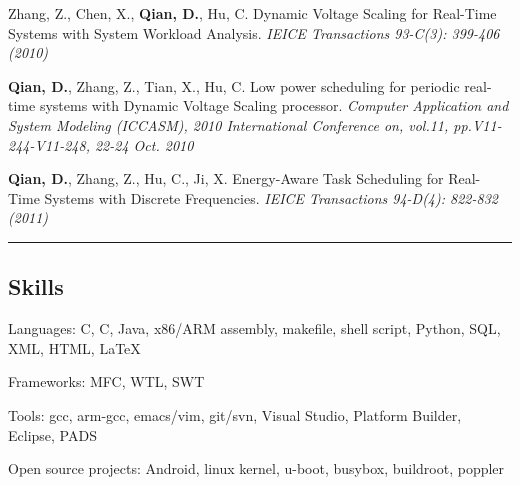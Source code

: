 \documentclass[10pt,letterpaper]{article}
\newenvironment{indentsection}[1]%
{\begin{list}{}%
	{\setlength{\leftmargin}{#1}}%
	\item[]%
}
{\end{list}}
\newcommand{\CPP}
{C\nolinebreak[4]\hspace{-.05em}\raisebox{.22ex}{\footnotesize\bf ++}}
\begin{document}
\begin{itemize*}
        \item
        Zhang, Z., Chen, X., \textbf{Qian, D.}, Hu, C. Dynamic Voltage Scaling for Real-Time Systems with System Workload Analysis. \emph{IEICE Transactions 93-C(3): 399-406 (2010)}
	\item
        \textbf{Qian, D.}, Zhang, Z., Tian, X., Hu, C. Low power scheduling for periodic real-time systems with Dynamic Voltage Scaling processor. \emph{Computer Application and System Modeling (ICCASM), 2010 International Conference on, vol.11, pp.V11-244-V11-248, 22-24 Oct. 2010}
	\item
	\textbf{Qian, D.}, Zhang, Z., Hu, C., Ji, X. Energy-Aware Task Scheduling for Real-Time Systems with Discrete Frequencies. \emph{IEICE Transactions 94-D(4): 822-832 (2011)}
\end{itemize*}

\hrule
\vspace{-0.4em}
\subsection*{Skills}

\begin{indentsection}{\parindent}
\begin{description*}
	\item[Languages:] C, \CPP, Java, x86/ARM assembly, makefile, shell script, Python, SQL, XML, HTML, \LaTeX
	\item[Frameworks:] MFC, WTL, SWT
	\item[Tools:] gcc, arm-gcc, emacs/vim, git/svn, Visual Studio, Platform Builder, Eclipse, PADS
	\item[Open source projects:]
	Android, linux kernel, u-boot, busybox, buildroot, poppler
\end{description*}
\end{indentsection}
\end{document}
